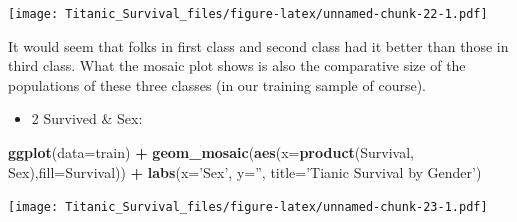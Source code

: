 \documentclass[]{article}
\newenvironment{Shaded}{\begin{snugshade}}{\end{snugshade}}
\newcommand{\KeywordTok}[1]{\textcolor[rgb]{0.13,0.29,0.53}{\textbf{#1}}}
\newcommand{\DataTypeTok}[1]{\textcolor[rgb]{0.13,0.29,0.53}{#1}}
\newcommand{\DecValTok}[1]{\textcolor[rgb]{0.00,0.00,0.81}{#1}}
\newcommand{\StringTok}[1]{\textcolor[rgb]{0.31,0.60,0.02}{#1}}
\newcommand{\CommentTok}[1]{\textcolor[rgb]{0.56,0.35,0.01}{\textit{#1}}}
\newcommand{\OperatorTok}[1]{\textcolor[rgb]{0.81,0.36,0.00}{\textbf{#1}}}
\newcommand{\NormalTok}[1]{#1}
\providecommand{\tightlist}{%
  \setlength{\itemsep}{0pt}\setlength{\parskip}{0pt}}
\begin{document}
\begin{Shaded}
\end{Shaded}

\texttt{[image: Titanic\_Survival\_files/figure-latex/unnamed-chunk-22-1.pdf]}

It would seem that folks in first class and second class had it better
than those in third class. What the mosaic plot shows is also the
comparative size of the populations of these three classes (in our
training sample of course).

\begin{itemize}
\tightlist
\item
  2 Survived \& Sex:
\end{itemize}

\begin{Shaded}
\begin{Highlighting}[]
\KeywordTok{ggplot}\NormalTok{(}\DataTypeTok{data=}\NormalTok{train) }\OperatorTok{+}
\StringTok{   }\KeywordTok{geom_mosaic}\NormalTok{(}\KeywordTok{aes}\NormalTok{(}\DataTypeTok{x=}\KeywordTok{product}\NormalTok{(Survival, Sex),}\DataTypeTok{fill=}\NormalTok{Survival)) }\OperatorTok{+}
\StringTok{   }\KeywordTok{labs}\NormalTok{(}\DataTypeTok{x=}\StringTok{'Sex'}\NormalTok{, }\DataTypeTok{y=}\StringTok{''}\NormalTok{, }\DataTypeTok{title=}\StringTok{'Tianic Survival by Gender'}\NormalTok{)}
\end{Highlighting}
\end{Shaded}

\texttt{[image: Titanic\_Survival\_files/figure-latex/unnamed-chunk-23-1.pdf]}
\end{document}
